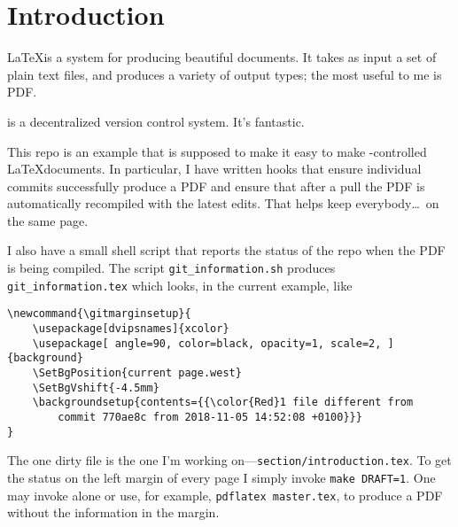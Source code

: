 \section{Introduction}

\LaTeX is a system for producing beautiful documents.
It takes as input a set of plain text files, and produces a variety of output types; the most useful to me is PDF.

\git is a decentralized version control system.
It's fantastic.

This repo\cite{latex-base} is an example that is supposed to make it easy to make \git-controlled \LaTeX documents.
In particular, I have written \git hooks that ensure individual commits successfully produce a PDF and ensure that after a pull the PDF is automatically recompiled with the latest edits.
That helps keep everybody\ldots\ on the same page.

I also have a small shell script that reports the status of the repo when the PDF is being compiled.
The script \texttt{git\_information.sh} produces \texttt{git\_information.tex} which looks, in the current example, like
\begin{verbatim}
\newcommand{\gitmarginsetup}{
    \usepackage[dvipsnames]{xcolor}
    \usepackage[ angle=90, color=black, opacity=1, scale=2, ]{background}
    \SetBgPosition{current page.west}
    \SetBgVshift{-4.5mm}
    \backgroundsetup{contents={{\color{Red}1 file different from 
        commit 770ae8c from 2018-11-05 14:52:08 +0100}}}
}\end{verbatim}
The one dirty file is the one I'm working on---\texttt{section/introduction.tex}.
To get the \git status on the left margin of every page I simply invoke \texttt{make DRAFT=1}.
One may invoke \make alone or use, for example, \texttt{pdflatex master.tex}, to produce a PDF without the \git information in the margin.
